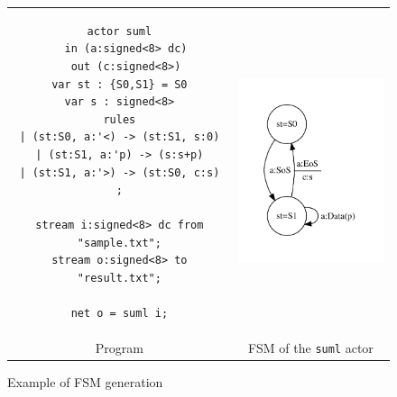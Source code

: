 \begin{figure}[h]
\begin{tabular}[c]{cc}
  \begin{minipage}[b]{0.5\linewidth}
    \begin{lstlisting}
actor suml
  in (a:signed<8> dc)
  out (c:signed<8>)
var st : {S0,S1} = S0
var s : signed<8>
rules
| (st:S0, a:'<) -> (st:S1, s:0)
| (st:S1, a:'p) -> (s:s+p)
| (st:S1, a:'>) -> (st:S0, c:s)
;

stream i:signed<8> dc from "sample.txt";
stream o:signed<8> to "result.txt";

net o = suml i;
    \end{lstlisting} 
  \end{minipage} &
  \begin{minipage}[b]{0.5\linewidth}
  \includegraphics[height=7cm]{figs/suml-act-fsm}
  \end{minipage} \\
Program & FSM of the \texttt{suml} actor
\end{tabular}
  \caption{Example of FSM generation}
  \label{fig:suml-act-fsm}
\end{figure}

